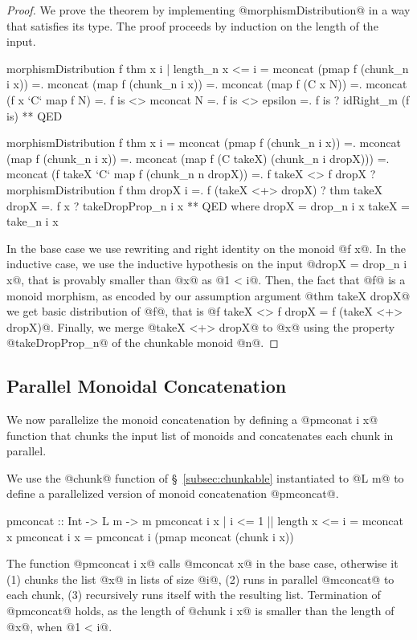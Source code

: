 \begin{proof}
We prove the theorem by implementing
@morphismDistribution@ in a way that satisfies its type.
%
The proof proceeds by induction on the length of the input.
%
\begin{code}
  morphismDistribution f thm x i
    | length_n x <= i
    =  mconcat (pmap f (chunk_n i x))
    =. mconcat (map f (chunk_n i x))
    =. mconcat (map f (C x N))
    =. mconcat (f x `C` map f N)
    =. f is <> mconcat N
    =. f is <> epsilon
    =. f is ? idRight_m (f is)
    ** QED
    
  morphismDistribution f thm x i
    =   mconcat (pmap f (chunk_n i x))
    =. mconcat (map f (chunk_n i x))
    =. mconcat (map f (C takeX) (chunk_n i dropX)))
    =. mconcat (f takeX `C` map f (chunk_n n dropX))
    =. f takeX <> f dropX   ? morphismDistribution f thm dropX i
    =. f (takeX <+> dropX)   ? thm takeX dropX
    =. f x                 ? takeDropProp_n i x
    ** QED
    where
      dropX = drop_n i x
      takeX = take_n i x
\end{code}
%
In the base case we use rewriting and right identity on the monoid @f x@.
%
In the inductive case,
we use the inductive hypothesis on the input @dropX = drop_n i x@,
that is provably smaller than @x@ as @1 < i@.
%
Then, the fact that @f@ is a monoid morphism,
as encoded by our assumption argument @thm takeX dropX@
we get basic distribution of @f@, that is
@f takeX <> f dropX = f (takeX <+> dropX)@.
%
Finally, we merge @takeX <+> dropX@ to @x@
using the property @takeDropProp_n@ of the chunkable monoid @n@.
\cqed\end{proof}


\subsection{Parallel Monoidal Concatenation}\label{subsec:pmconcat}
%
We now parallelize the monoid concatenation by defining a
@pmconat i x@ function that chunks the input list of monoids and concatenates each
chunk in parallel.

We use the @chunk@ function of \S~\ref{subsec:chunkable} instantiated to @L m@ to define a parallelized version of
monoid concatenation @pmconcat@.
\begin{code}
  pmconcat :: Int -> L m -> m
  pmconcat i x | i <= 1 || length x <= i
    = mconcat x
  pmconcat i x
    = pmconcat i (pmap mconcat (chunk i x))
\end{code}
The function @pmconcat i x@ calls @mconcat x@ in the base case,
otherwise it
(1) chunks the list @x@ in lists of size @i@,
(2) runs in parallel @mconcat@ to each chunk,
(3) recursively runs itself with the resulting list.
%
Termination of @pmconcat@ holds, as the length of @chunk i x@
is smaller than the length of @x@, when @1 < i@.

